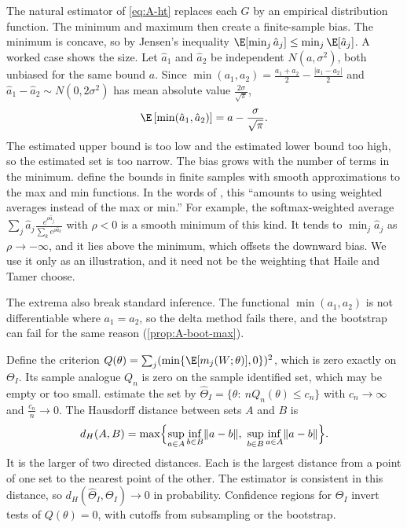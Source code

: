 The natural estimator of \eqref{eq:A-ht} replaces each $G$ by an empirical distribution function. The
minimum and maximum then create a finite-sample bias. The minimum is concave, so by Jensen's inequality
$\E[\min_j\hat a_j]\le\min_j\E[\hat a_j]$. A worked case shows the size. Let $\hat a_1$ and $\hat a_2$ be
independent $N(a,\sigma^2)$, both unbiased for the same bound $a$. Since $\min(a_1,a_2)=\frac{a_1+a_2}{2}-\frac{|a_1-a_2|}{2}$
and $\hat a_1-\hat a_2\sim N(0,2\sigma^2)$ has mean absolute value $\frac{2\sigma}{\sqrt\pi}$,
\begin{equation*}
\E\left[\min(\hat a_1,\hat a_2)\right]=a-\frac{\sigma}{\sqrt\pi}.
\end{equation*}
The estimated upper bound is too low and the estimated lower bound too high, so the estimated set is too
narrow. The bias grows with the number of terms in the minimum. \citet{HaileTamer2003} define the
bounds in finite samples with smooth approximations to the max and min functions. In the words of
\citet[Section~4.3.1, p.~35]{AtheyHaile2007}, this ``amounts to using weighted averages instead of the max or min.''
For example, the softmax-weighted average
$\sum_j\hat a_j\frac{e^{\rho\hat a_j}}{\sum_ke^{\rho\hat a_k}}$ with $\rho<0$ is a smooth minimum of
this kind. It tends to $\min_j\hat a_j$ as $\rho\to-\infty$, and it lies above the minimum, which
offsets the downward bias. We use it only as an illustration, and it need not be the weighting that Haile
and Tamer choose.

The extrema also break standard inference. The functional $\min(a_1,a_2)$ is not differentiable where
$a_1=a_2$, so the delta method fails there, and the bootstrap can fail for the same reason
(\cref{prop:A-boot-max}).

Define the criterion $Q(\theta)=\sum_j(\min\{\E[m_j(W;\theta)],0\})^2$, which is zero exactly on
$\Theta_I$. Its sample analogue $Q_n$ is zero on the sample identified set, which may be empty or too
small. \citet{ChernozhukovHongTamer2007} estimate the set by $\hat\Theta_I=\{\theta:\ nQ_n(\theta)\le c_n\}$
with $c_n\to\infty$ and $\frac{c_n}{n}\to0$. The Hausdorff distance between sets $A$ and $B$ is
\begin{equation*}
d_H(A,B)=\max\Bigl\{\sup_{a\in A}\inf_{b\in B}\lVert a-b\rVert,\ \sup_{b\in B}\inf_{a\in A}\lVert a-b\rVert\Bigr\}.
\end{equation*}
It is the larger of two directed distances. Each is the largest distance from a point of one set to the nearest
point of the other. The estimator is consistent in this distance, so $d_H(\hat\Theta_I,\Theta_I)\to0$ in
probability. Confidence regions
for $\Theta_I$ invert tests of $Q(\theta)=0$, with cutoffs from subsampling or the bootstrap.

